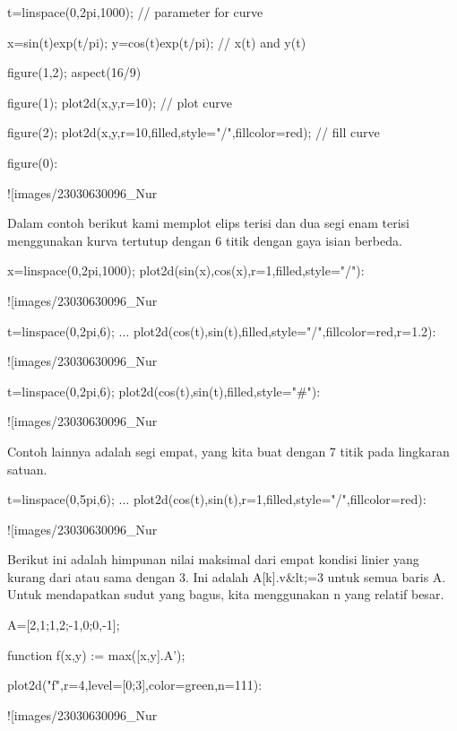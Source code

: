 \documentclass{article}
\begin{document}
\>t=linspace(0,2pi,1000); // parameter for curve

\>x=sin(t)\*exp(t/pi); y=cos(t)\*exp(t/pi); // x(t) and y(t)

\>figure(1,2); aspect(16/9)

\>figure(1); plot2d(x,y,r=10); // plot curve

\>figure(2); plot2d(x,y,r=10,\>filled,style="/",fillcolor=red); // fill curve

\>figure(0):


![images/23030630096_Nur%

Dalam contoh berikut kami memplot elips terisi dan dua segi enam
terisi menggunakan kurva tertutup dengan 6 titik dengan gaya isian
berbeda.


\>x=linspace(0,2pi,1000); plot2d(sin(x),cos(x),r=1,\>filled,style="/"):


![images/23030630096_Nur%

\>t=linspace(0,2pi,6); ...  
\>   plot2d(cos(t),sin(t),\>filled,style="/",fillcolor=red,r=1.2):


![images/23030630096_Nur%

\>t=linspace(0,2pi,6); plot2d(cos(t),sin(t),\>filled,style="#"):


![images/23030630096_Nur%

Contoh lainnya adalah segi empat, yang kita buat dengan 7 titik pada
lingkaran satuan.


\>t=linspace(0,5pi,6);  ...  
\>    plot2d(cos(t),sin(t),r=1,\>filled,style="/",fillcolor=red):


![images/23030630096_Nur%

Berikut ini adalah himpunan nilai maksimal dari empat kondisi linier
yang kurang dari atau sama dengan 3. Ini adalah A[k].v&lt;=3 untuk semua
baris A. Untuk mendapatkan sudut yang bagus, kita menggunakan n yang
relatif besar.


\>A=[2,1;1,2;-1,0;0,-1];

\>function f(x,y) := max([x,y].A');

\>plot2d("f",r=4,level=[0;3],color=green,n=111):


![images/23030630096_Nur%
\end{document}
